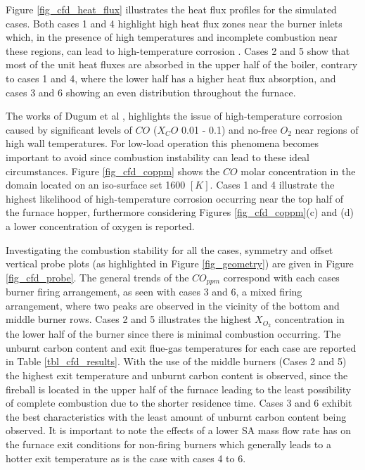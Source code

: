 \documentclass[review]{elsarticle}
\begin{document}
Figure \ref{fig_cfd_heat_flux} illustrates the heat flux profiles for the simulated cases. Both cases 1 and 4 highlight high heat flux zones near the burner inlets which, in the presence of high temperatures and incomplete combustion near these regions, can lead to high-temperature corrosion \cite{Du2017}. Cases 2 and 5 show that most of the unit heat fluxes are absorbed in the upper half of the boiler, contrary to cases 1 and 4, where the lower half has a higher heat flux absorption, and cases 3 and 6 showing an even distribution throughout the furnace.

The works of Dugum et al \citep{Du2017}, highlights the issue of high-temperature corrosion caused by significant levels of $CO$ ($X_CO$ 0.01 - 0.1) and no-free $O_2$ near regions of high wall temperatures. For low-load operation this phenomena becomes important to avoid since combustion instability can lead to these ideal circumstances. Figure \ref{fig_cfd_coppm} shows the $CO$ molar concentration in the domain located on an iso-surface set 1600 $[K]$. Cases 1 and 4 illustrate the highest likelihood of high-temperature corrosion occurring near the top half of the furnace hopper, furthermore considering Figures \ref{fig_cfd_coppm}(c) and (d) a lower concentration of oxygen is reported.

Investigating the combustion stability for all the cases, symmetry and offset vertical probe plots (as highlighted in Figure \ref{fig_geometry}) are given in Figure \ref{fig_cfd_probe}. The general trends of the $CO_{ppm}$ correspond with each cases burner firing arrangement, as seen with cases 3 and 6, a mixed firing arrangement, where two peaks are observed in the vicinity of the bottom and middle burner rows. Cases 2 and 5 illustrates the highest $X_{O_{2}}$ concentration in the lower half of the burner since there is minimal combustion occurring. The unburnt carbon content and exit flue-gas temperatures for each case are reported in Table \ref{tbl_cfd_results}. With the use of the middle burners (Cases 2 and 5) the highest exit temperature and unburnt carbon content is observed, since the fireball is located in the upper half of the furnace leading to the least possibility of complete combustion due to the shorter residence time. Cases 3 and 6 exhibit the best characteristics with the least amount of unburnt carbon content being observed. It is important to note the effects of a lower SA mass flow rate has on the furnace exit conditions for non-firing burners which generally leads to a hotter exit temperature as is the case with cases 4 to 6. 
\end{document}

